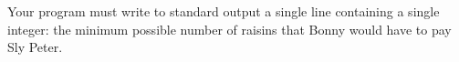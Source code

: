 Your program must write to standard output a single line containing a single integer: the minimum possible number of raisins that Bonny would have to pay Sly Peter.